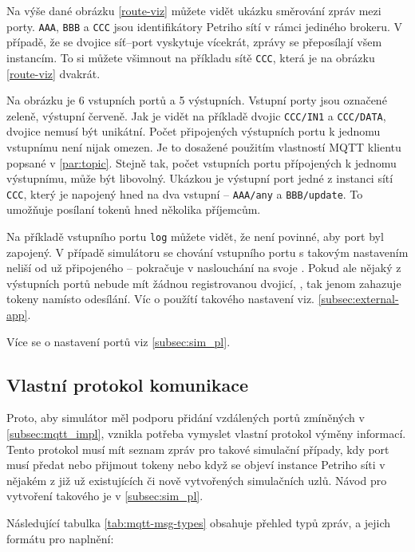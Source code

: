 Na výše dané obrázku \ref{route-viz} můžete vidět ukázku směrování zpráv mezi porty. \texttt{AAA}, \texttt{BBB} a \texttt{CCC} jsou identifikátory Petriho sítí v rámci jediného brokeru. V případě, že se dvojice síť--port  vyskytuje vícekrát, zprávy se přeposílají všem instancím. To si můžete všimnout na příkladu sítě \texttt{CCC}, která je na obrázku \ref{route-viz} dvakrát.

Na obrázku je 6 vstupních portů a 5 výstupních. Vstupní porty jsou označené zeleně, výstupní červeně. Jak je vidět na příkladě dvojic \texttt{CCC/IN1} a \texttt{CCC/DATA}, dvojice nemusí být unikátní. Počet připojených výstupních portu k jednomu vstupnímu není nijak omezen. Je to dosažené použitím vlastností MQTT klientu popsané v \ref{par:topic}. Stejně tak, počet vstupních portu přípojených k jednomu výstupnímu, může být libovolný. Ukázkou je výstupní port jedné z instanci sítí \texttt{CCC}, který je napojený hned na dva vstupní -- \texttt{AAA/any} a \texttt{BBB/update}. To umožňuje posílaní tokenů hned několika příjemcům.

Na příkladě vstupního portu \texttt{log} můžete vidět, že není povinné, aby port byl zapojený. V případě simulátoru se chování vstupního portu s takovým nastavením  neliší od už připojeného -- pokračuje v naslouchání na svoje . Pokud ale nějaký z výstupních portů nebude mít žádnou registrovanou dvojicí, , tak jenom zahazuje tokeny namísto odesílání. Víc o použítí takového nastavení viz. \ref{subsec:external-app}.

Více se o nastavení portů viz \ref{subsec:sim_pl}.

\subsection{Vlastní protokol komunikace}
\label{subsec:comm-proto}

Proto, aby simulátor měl podporu přidání vzdálených portů zmíněných v \ref{subsec:mqtt_impl}, vznikla potřeba vymyslet vlastní protokol výměny informací. Tento protokol musí mít seznam zpráv pro takové simulační případy, kdy port musí předat nebo přijmout tokeny nebo když se objeví instance Petriho síti v nějakém z již už existujících či nově vytvořených simulačních uzlů. Návod pro vytvoření takového je v \ref{subsec:sim_pl}.

Následující tabulka \ref{tab:mqtt-msg-types} obsahuje přehled typů zpráv, a jejich formátu pro naplnění:

